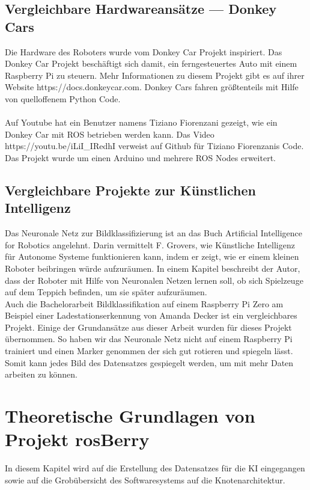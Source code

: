 \documentclass[conference]{IEEEtran}
\begin{document}
\subsection{Vergleichbare Hardwareansätze — Donkey Cars} %
Die Hardware des Roboters wurde vom Donkey Car Projekt inspiriert.
Das Donkey Car Projekt beschäftigt sich damit, ein ferngesteuertes Auto mit einem Raspberry Pi zu steuern.
Mehr Informationen zu diesem Projekt gibt es auf ihrer Website https://docs.donkeycar.com.
Donkey Cars fahren größtenteils mit Hilfe von quelloffenem Python Code. \\
\\
Auf Youtube hat ein Benutzer namens Tiziano Fiorenzani gezeigt, wie ein Donkey Car mit ROS betrieben werden kann.
Das Video https://youtu.be/iLiI\_IRedhI verweist auf Github für Tiziano Fiorenzanis Code.
Das Projekt wurde um einen Arduino und mehrere ROS Nodes erweitert.

\subsection{Vergleichbare Projekte zur Künstlichen Intelligenz} %
Das Neuronale Netz zur Bildklassifizierung ist an das Buch \glqq Artificial Intelligence for Robotics\grqq  \cite{b1} angelehnt.
Darin vermittelt F. Grovers, wie Künstliche Intelligenz für Autonome Systeme funktionieren kann, indem er zeigt, wie er einem kleinen Roboter beibringen würde aufzuräumen.
In einem Kapitel beschreibt der Autor, dass der Roboter mit Hilfe von Neuronalen Netzen lernen soll, ob sich Spielzeuge auf dem Teppich befinden, um sie später aufzuräumen.\\

Auch die Bachelorarbeit \glqq Bildklassifikation auf einem Raspberry Pi Zero am Beispiel einer Ladestationserkennung \grqq \cite{b2} von Amanda Decker ist ein vergleichbares Projekt.
Einige der Grundansätze aus dieser Arbeit wurden für dieses Projekt übernommen.
So haben wir das Neuronale Netz nicht auf einem Raspberry Pi trainiert und einen Marker genommen der sich gut rotieren und spiegeln lässt.
Somit kann jedes Bild des Datensatzes gespiegelt werden, um mit mehr Daten arbeiten zu können.

\section{Theoretische Grundlagen von Projekt rosBerry}
In diesem Kapitel wird auf die Erstellung des Datensatzes für die KI eingegangen sowie auf die Grobübersicht des Softwaresystems auf die Knotenarchitektur. %
\end{document}
